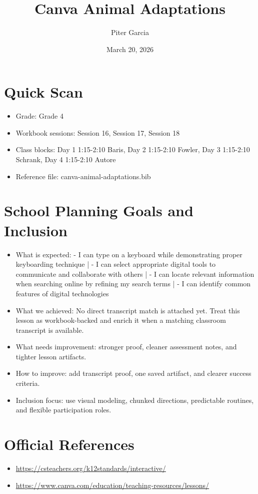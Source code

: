 \documentclass[11pt]{article}
\title{Canva Animal Adaptations}
\author{Piter Garcia}
\date{March 20, 2026}
\begin{document}
    \maketitle
    \section*{Quick Scan}
    \begin{itemize}[leftmargin=*]
    \item Grade: Grade 4
    \item Workbook sessions: Session 16, Session 17, Session 18
    \item Class blocks: Day 1 1:15-2:10 Baris, Day 2 1:15-2:10 Fowler, Day 3 1:15-2:10 Schrank, Day 4 1:15-2:10 Autore
    \item Reference file: canva-animal-adaptations.bib
    \end{itemize}
    \section*{School Planning Goals and Inclusion}
    \begin{itemize}[leftmargin=*]
    \item What is expected: - I can type on a keyboard while demonstrating proper keyboarding technique | - I can select appropriate digital tools to communicate and collaborate with others | - I can locate relevant information when searching online by refining my search terms | - I can identify common features of digital technologies
    \item What we achieved: No direct transcript match is attached yet. Treat this lesson as workbook-backed and enrich it when a matching classroom transcript is available.
    \item What needs improvement: stronger proof, cleaner assessment notes, and tighter lesson artifacts.
    \item How to improve: add transcript proof, one saved artifact, and clearer success criteria.
    \item Inclusion focus: use visual modeling, chunked directions, predictable routines, and flexible participation roles.
    \end{itemize}
    \section*{Official References}
    \begin{itemize}[leftmargin=*]
    \item \url{https://csteachers.org/k12standards/interactive/}
\item \url{https://www.canva.com/education/teaching-resources/lessons/}

    \end{itemize}
    
\end{document}
